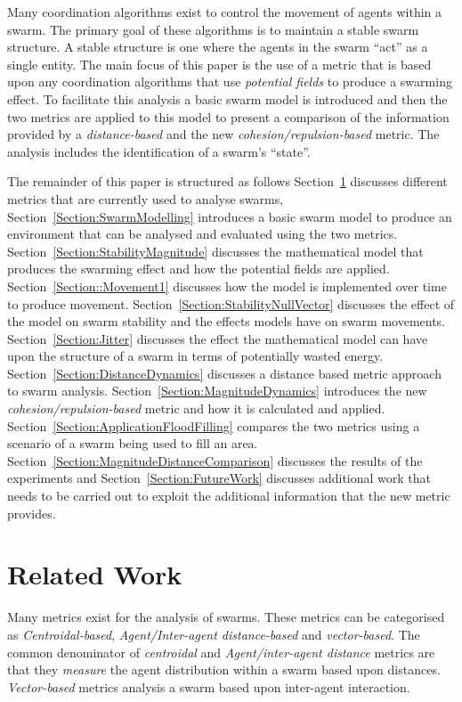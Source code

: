 \documentclass{ieeeaccess}
\begin{document}
Many coordination algorithms exist to control the movement of agents within a swarm. The primary goal of these algorithms is to maintain a stable swarm structure. A stable structure is one where the agents in the swarm ``act'' as a single entity. The main focus of this paper is the use of a metric that is based upon any coordination algorithms that use \textit{potential fields} to produce a swarming effect. To facilitate this analysis a basic swarm model is introduced and then the two metrics are applied to this model to present a comparison of the information provided by a \textit{distance-based} and the new \textit{cohesion/repulsion-based} metric. The analysis includes the identification of a swarm's ``state''. 

The remainder of this paper is structured as follows Section~\ref{Section:Related} discusses different metrics that are currently used to analyse swarms, Section~\ref{Section:SwarmModelling} introduces a basic swarm model to produce an environment that can be analysed and evaluated using the two metrics. Section~\ref{Section:StabilityMagnitude} discusses the mathematical model that produces the swarming effect and how the potential fields are applied. Section~\ref{Section::Movement1} discusses how the model is implemented over time to produce movement. Section~\ref{Section:StabilityNullVector} discusses the effect of the model on swarm stability and the effects models have on swarm movements. Section~\ref{Section:Jitter} discusses the effect the mathematical model can have upon the structure of a swarm in terms of potentially wasted energy. Section~\ref{Section:DistanceDynamics} discusses a distance based metric approach to swarm analysis. Section~\ref{Section:MagnitudeDynamics} introduces the new \textit{cohesion/repulsion-based} metric and how it is calculated and applied. Section~\ref{Section:ApplicationFloodFilling} compares the two metrics using a scenario of a swarm being used to fill an area. Section~\ref{Section:MagnitudeDistanceComparison} discusses the results of the experiments and Section~\ref{Section:FutureWork} discusses additional work that needs to be carried out to exploit the additional information that the new metric provides.

\section{Related Work}\label{Section:Related}

Many metrics exist for the analysis of swarms. These metrics can be categorised as \textit{Centroidal-based}, \textit{Agent/Inter-agent distance-based} and \textit{vector-based}. The common denominator of \textit{centroidal} and \textit{Agent/inter-agent distance} metrics are that they \textit{measure} the agent distribution within a swarm based upon distances. \textit{Vector-based} metrics analysis a swarm based upon inter-agent interaction. 
\end{document}
